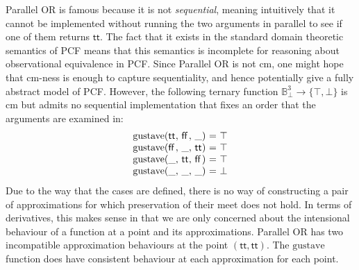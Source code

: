 \begin{example}
  Parallel OR is famous because it is not \emph{sequential}, meaning intuitively that it cannot be implemented without running the two arguments in parallel to see if one of them returns $\mathsf{tt}$. The fact that it exists in the standard domain theoretic semantics of PCF means that this semantics is incomplete for reasoning about observational equivalence in PCF. Since Parallel OR is not cm, one might hope that cm-ness is enough to capture sequentiality, and hence potentially give a fully abstract model of PCF. However, the following ternary function $\mathbb{B}_\bot^3 \to \{\top,\bot\}$ is cm but admits no sequential implementation that fixes an order that the arguments are examined in:
  \begin{displaymath}
    \begin{array}{l@{(}l@{,~}l@{,~}l@{)~}c@{~}l}
      \mathrm{gustave}&\mathsf{tt}&\mathsf{ff}&\_&=&\top \\
      \mathrm{gustave}&\mathsf{ff}&\_&\mathsf{tt}&=&\top \\
      \mathrm{gustave}&\_&\mathsf{tt}&\mathsf{ff}&=&\top \\
      \mathrm{gustave}&\_&\_&\_&=&\bot
    \end{array}
  \end{displaymath}
  Due to the way that the cases are defined, there is no way of constructing a pair of approximations for which preservation of their meet does not hold. In terms of derivatives, this makes sense in that we are only concerned about the intensional behaviour of a function at a point and its approximations. Parallel OR has two incompatible approximation behaviours at the point $(\mathsf{tt},\mathsf{tt})$. The $\mathrm{gustave}$ function does have consistent behaviour at each approximation for each point.
\end{example}

